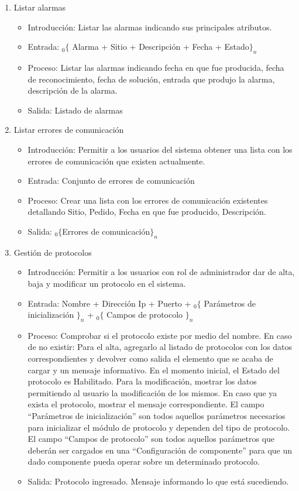 \begin{enumerate}
			\item Listar alarmas
				\begin{itemize}
					\item Introducción: Listar las alarmas indicando sus principales atributos.
					\item Entrada: ${}_{0}\{$ Alarma + Sitio + Descripción  + Fecha + Estado$\}_n$
					\item Proceso: Listar las alarmas indicando fecha en que fue producida, fecha de reconocimiento, fecha de solución, entrada que produjo la alarma, descripción de la alarma.
					\item Salida:	Listado de alarmas
				\end{itemize}
				
			\item Listar errores de comunicación
				\begin{itemize}
					\item Introducción: Permitir a los usuarios del sistema obtener una lista con los errores de comunicación que existen actualmente.
					\item Entrada: Conjunto de errores de comunicación
					\item Proceso: Crear una lista con los errores de comunicación existentes detallando Sitio, Pedido, Fecha en que fue producido, Descripción.
					\item Salida:	${}_{0}\{$Errores de comunicación$\}_n$
				\end{itemize}
				
			\item Gestión de protocolos
				\begin{itemize}
					\item Introducción: Permitir a los usuarios con rol de administrador dar de alta, baja y modificar un protocolo en el sistema.
					\item Entrada: Nombre + Dirección Ip + Puerto + ${}_{0}\{$ Parámetros de inicialización $\}_n$  + ${}_{0}\{$ Campos de protocolo $\}_n$
					\item Proceso: Comprobar si el protocolo existe por medio del nombre. En caso de no existir:
							Para el alta, agregarlo al listado de protocolos con los datos correspondientes y devolver como salida el elemento que se acaba de cargar y un mensaje informativo. En el momento inicial, el Estado del protocolo es Habilitado.
							Para la modificación, mostrar los datos permitiendo al usuario la modificación de los mismos.
							En caso que ya exista el protocolo, mostrar el mensaje correspondiente.
							El campo ``Parámetros de inicialización'' son todos aquellos parámetros necesarios para inicializar el módulo de protocolo y dependen del tipo de protocolo.
							El campo ``Campos de protocolo'' son todos aquellos parámetros que deberán ser cargados en una ``Configuración de componente'' para que un dado componente pueda operar sobre un determinado protocolo.
					\item Salida: Protocolo ingresado. Mensaje informando lo que está sucediendo.
				\end{itemize}
				

\end{enumerate}
